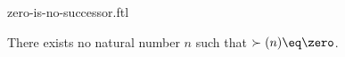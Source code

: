 \documentclass{naproche-library}
\begin{document}
\begin{smodule}[title=$0$ is no Successor]{zero-is-no-successor.ftl}


\begin{axiom}[forthel,id=ZeroIsNoSuccAx]
  There exists no natural number $n$ such that $\succ(n) \eq \zero$.
\end{axiom}

\end{smodule}
\end{document}
